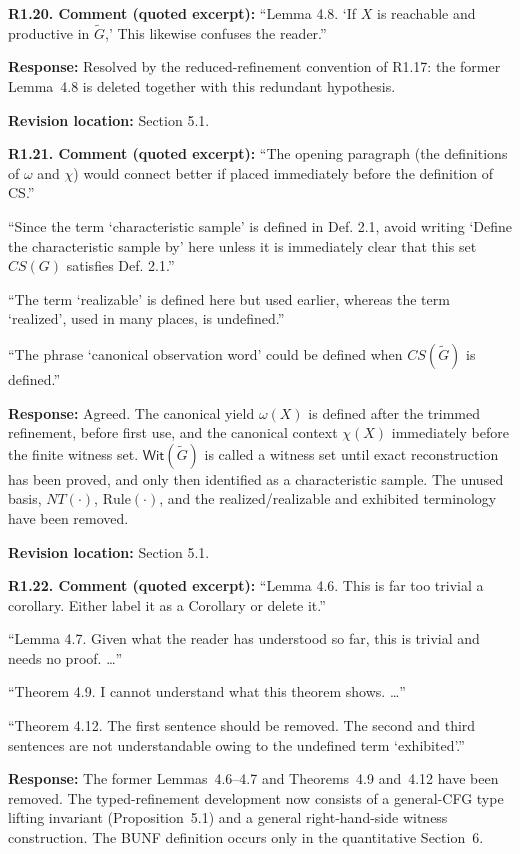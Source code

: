 \documentclass[
  10pt,
  a4paper,
]{article}
\begin{document}
\textbf{R1.20. Comment (quoted excerpt):} ``Lemma 4.8. `If \(X\) is reachable
and productive in \(\widetilde G\),' This likewise confuses the
reader.''

\textbf{Response:} Resolved by the reduced-refinement convention of
R1.17: the former Lemma~4.8 is deleted together with this redundant
hypothesis.

\textbf{Revision location:} Section 5.1.


\textbf{R1.21. Comment (quoted excerpt):} ``The opening paragraph (the
definitions of \(\omega\) and \(\chi\)) would connect better if placed
immediately before the definition of CS.''

``Since the term `characteristic sample' is defined in Def. 2.1, avoid
writing `Define the characteristic sample by' here unless it is
immediately clear that this set \(CS(G)\) satisfies Def.
2.1.''

``The term `realizable' is defined here but used earlier, whereas the
term `realized', used in many places, is undefined.''

``The phrase `canonical observation word' could be defined when
\(CS(\widetilde G)\) is defined.''

\textbf{Response:} Agreed. The canonical yield $\omega(X)$ is defined
after the trimmed refinement, before first use, and the canonical context
$\chi(X)$ immediately before the finite witness set.
$\mathsf{Wit}(\widetilde G)$ is called a witness set until exact
reconstruction has been proved, and only then identified as a
characteristic sample. The unused basis, $NT(\cdot)$, $\mathrm{Rule}(\cdot)$,
and the realized/realizable and exhibited terminology have been removed.

\textbf{Revision location:} Section 5.1.


\textbf{R1.22. Comment (quoted excerpt):} ``Lemma 4.6. This is far too trivial
a corollary. Either label it as a Corollary or delete it.''

``Lemma 4.7. Given what the reader has understood so far, this is
trivial and needs no proof. \ldots{}''

``Theorem 4.9. I cannot understand what this theorem shows. \ldots{}''

``Theorem 4.12. The first sentence should be removed. The second and
third sentences are not understandable owing to the undefined term
`exhibited'.''

\textbf{Response:} The former Lemmas~4.6--4.7 and Theorems~4.9 and~4.12 have been removed.
The typed-refinement development now consists of a general-CFG
type lifting invariant (Proposition~5.1) and a general
right-hand-side witness construction.  The BUNF definition
occurs only in the quantitative Section~6.
\end{document}

